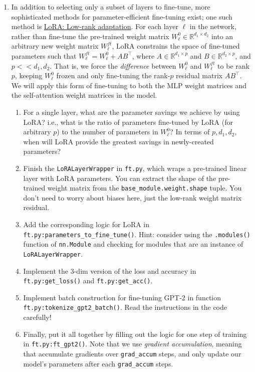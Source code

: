 \documentclass[12pt]{article}
\begin{document}
\begin{enumerate}
    \item In addition to selecting only a subset of layers to fine-tune, more sophisticated methods for parameter-efficient fine-tuning exist; one such method is \href{https://arxiv.org/pdf/2106.09685.pdf}{LoRA: Low-rank adaptation}. For each layer $\ell$ in the network, rather than fine-tune the pre-trained weight matrix $W_\ell^0 \in \mathbb{R}^{d_1\times d_2}$ into an arbitrary new weight matrix $W_\ell^{ft}$, LoRA constrains the space of fine-tuned parameters such that $W_\ell^{ft} = W_\ell^0 + AB^\top$, where $A \in \mathbb{R}^{d_1\times p}$ and $B \in \mathbb{R}^{d_2\times p}$, and $p << d_1,d_2$. That is, we force the \textit{difference} between $W_\ell^0$ and $W_\ell^{ft}$ to be rank $p$, keeping $W_\ell^0$ frozen and only fine-tuning the rank-$p$ residual matrix $AB^\top$. We will apply this form of fine-tuning to both the MLP weight matrices and the self-attention weight matrices in the model.
    \begin{enumerate}
        \item For a single layer, what are the parameter savings we achieve by using LoRA? i.e., what is the ratio of parameters fine-tuned by LoRA (for arbitrary $p$) to the number of parameters in $W_\ell^0$? In terms of $p,d_1,d_2$, when will LoRA provide the greatest savings in newly-created parameters?
        \item Finish the \texttt{LoRALayerWrapper} in \texttt{ft.py}, which wraps a pre-trained linear layer with LoRA parameters. You can extract the shape of the pre-trained weight matrix from the \texttt{base\_module.weight.shape} tuple. You don't need to worry about biases here, just the low-rank weight matrix residual.
        
        \item Add the corresponding logic for LoRA in \texttt{ft.py:parameters\_to\_fine\_tune()}. Hint: consider using the \texttt{.modules()} function of \texttt{nn.Module} and checking for modules that are an instance of \texttt{LoRALayerWrapper}.
        \item Implement the 3-dim version of the loss and accuracy in \texttt{ft.py:get\_loss()} and \texttt{ft.py:get\_acc()}.
        \item Implement batch construction for fine-tuning GPT-2 in function \texttt{ft.py:\allowbreak tokenize\_\allowbreak gpt2\_batch()}. Read the instructions in the code carefully!
        \item Finally, put it all together by filling out the logic for one step of training in \texttt{ft.py:ft\_gpt2()}. Note that we use \textit{gradient accumulation}, meaning that accumulate gradients over \texttt{grad\_accum} steps, and only update our model's parameters after each \texttt{grad\_accum} steps.
    \end{enumerate}
    

\end{enumerate}
\end{document}
